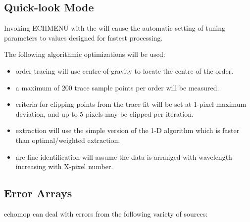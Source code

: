 \subsection{Quick-look Mode}

Invoking ECHMENU with the 
will cause the automatic setting of tuning parameters to values designed for
fastest processing.

The following algorithmic optimizations will be used:

\begin{itemize}

\item order tracing will use centre-of-gravity to locate the centre
      of the order.

\item a maximum of 200 trace sample points per order will be measured.

\item criteria for clipping points from the trace fit will be set
      at 1-pixel maximum deviation, and up to 5 pixels may be clipped
      per iteration.

\item extraction will use the simple version of the 1-D algorithm
      which is faster than optimal/weighted extraction.

\item arc-line identification will assume the data is arranged
      with wavelength increasing with X-pixel number.

\end{itemize}


\subsection{Error Arrays}

{\sc echomop} can deal with errors from the following variety of sources:


